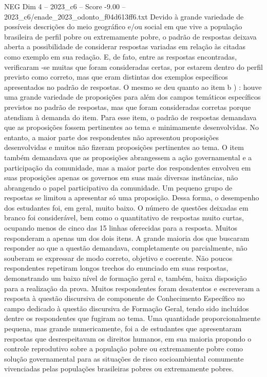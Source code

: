 \begin{textsample}{NEG Dim 4 – 2023\_c6 – Score -9.00 – 2023\_c6/enade\_2023\_odonto\_f04d613ff6.txt}
Devido à grande variedade de possíveis descrições do meio geográfico e/ou social em que vive a população brasileira de perfil pobre ou extremamente pobre, o padrão de respostas deixava aberta a possibilidade de considerar respostas variadas em relação às citadas como exemplo em sua redação.
E, de fato, entre as respostas encontradas, verificaram -se muitas que foram consideradas certas, por estarem dentro do perfil previsto como correto, mas que eram distintas dos exemplos específicos apresentados no padrão de respostas.
O mesmo se deu quanto ao item b ) : houve uma grande variedade de proposições para além dos campos temáticos específicos previstos no padrão de respostas, mas que foram consideradas corretas porque atendiam à demanda do item.
Para esse item, o padrão de respostas demandava que as proposições fossem pertinentes ao tema e minimamente desenvolvidas.
No entanto, a maior parte dos respondentes não apresentou proposições desenvolvidas e muitos não fizeram proposições pertinentes ao tema.
O item também demandava que as proposições abrangessem a ação governamental e a participação da comunidade, mas a maior parte dos respondentes envolveu em suas proposições apenas os governos em suas mais diversas instâncias, não abrangendo o papel participativo da comunidade.
Um pequeno grupo de respostas se limitou a apresentar só uma proposição.
Dessa forma, o desempenho dos estudantes foi, em geral, muito baixo.
O número de questões deixadas em branco foi considerável, bem como o quantitativo de respostas muito curtas, ocupando menos de cinco das 15 linhas oferecidas para a resposta.
Muitos responderam a apenas um dos dois itens.
A grande maioria dos que buscaram responder ao que a questão demandava, completamente ou parcialmente, não souberam se expressar de modo correto, objetivo e coerente.
Não poucos respondentes repetiram longos trechos do enunciado em suas respostas, demonstrando um baixo nível de formação geral e, também, baixa disposição para a realização da prova.
Muitos respondentes foram desatentos e escreveram a resposta à questão discursiva de componente de Conhecimento Específico no campo dedicado à questão discursiva de Formação Geral, tendo sido incluídos dentre os respondentes que fugiram ao tema.
Uma quantidade proporcionalmente pequena, mas grande numericamente, foi a de estudantes que apresentaram respostas que desrespeitavam os direitos humanos, em sua maioria propondo o controle reprodutivo sobre a população pobre ou extremamente pobre como solução governamental para as situações de risco socioambiental comumente vivenciadas pelas populações brasileiras pobres ou extremamente pobres.

\end{textsample}
